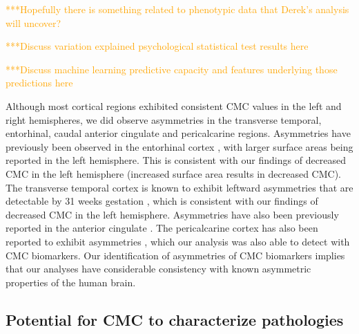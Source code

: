 \documentclass{article}
\begin{document}
\textcolor{orange}{%
***Hopefully there is something related to phenotypic data that Derek's
analysis will uncover?
}

\textcolor{orange}{%
***Discuss variation explained psychological statistical test results here
}

\textcolor{orange}{%
***Discuss machine learning predictive capacity and features underlying those
predictions here
}

Although most cortical regions exhibited consistent CMC values in the left
and right hemispheres, we did observe asymmetries in the transverse temporal,
entorhinal, caudal anterior cingulate and pericalcarine regions. Asymmetries
have previously been observed in the entorhinal cortex
\citep{simicHemisphericAsymmetryModular2005}, with larger surface areas being
reported in the left hemisphere. This is consistent with our findings of
decreased CMC in the left hemisphere (increased surface area results in
decreased CMC). The transverse temporal cortex is known to exhibit leftward
asymmetries that are detectable by 31 weeks gestation
\citep{chiLeftRightAsymmetriesTemporal1977}, which is consistent with our
findings of decreased CMC in the left hemisphere. Asymmetries have also been
previously reported in the anterior cingulate
\citep{yanHemisphericAsymmetryCognitive2009}. The pericalcarine cortex has
also been reported to exhibit asymmetries
\citep{chiarelloStructuralAsymmetryHuman2016,koelkebeckContributionCorticalThickness2014},
which our analysis was also able to detect with CMC biomarkers. Our
identification of asymmetries of CMC biomarkers implies that our analyses
have considerable consistency with known asymmetric properties of the human
brain.

\subsection{Potential for CMC to characterize pathologies}
\end{document}
